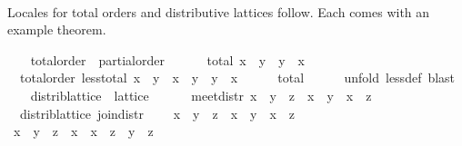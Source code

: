 \begin{isabellebody}
\endisataginvisible
{\isafoldinvisible}%
%
\isadeliminvisible
\isanewline
%
\endisadeliminvisible
\isanewline
\ \ \isamarkupfalse%
%
\begin{isamarkuptext}%
Locales for total orders and distributive lattices follow.
  Each comes with an example theorem.%
\end{isamarkuptext}%
\isamarkuptrue%
\ \ \isamarkupfalse%
\ total{\isacharunderscore}order\ {\isacharequal}\ partial{\isacharunderscore}order\ {\isacharplus}\isanewline
\ \ \ \ \ total{\isacharcolon}\ {\isachardoublequoteopen}x\ {\isasymsqsubseteq}\ y\ {\isasymor}\ y\ {\isasymsqsubseteq}\ x{\isachardoublequoteclose}\isanewline
\isanewline
\ \ \isamarkupfalse%
\ {\isacharparenleft}\ total{\isacharunderscore}order{\isacharparenright}\ less{\isacharunderscore}total{\isacharcolon}\ {\isachardoublequoteopen}x\ {\isasymsqsubset}\ y\ {\isasymor}\ x\ {\isacharequal}\ y\ {\isasymor}\ y\ {\isasymsqsubset}\ x{\isachardoublequoteclose}\isanewline
%
\isadelimproof
\ \ \ \ %
\endisadelimproof
%
\isatagproof
{}\isamarkupfalse%
\ total\isanewline
\ \ \ \ \isamarkupfalse%
\ {\isacharparenleft}unfold\ less{\isacharunderscore}def{\isacharparenright}\ blast%
\endisatagproof
{\isafoldproof}%
%
\isadelimproof
\isanewline
%
\endisadelimproof
\isanewline
\ \ \isamarkupfalse%
\ distrib{\isacharunderscore}lattice\ {\isacharequal}\ lattice\ {\isacharplus}\isanewline
\ \ \ \ \ meet{\isacharunderscore}distr{\isacharcolon}\ {\isachardoublequoteopen}x\ {\isasymsqinter}\ {\isacharparenleft}y\ {\isasymsqunion}\ z{\isacharparenright}\ {\isacharequal}\ x\ {\isasymsqinter}\ y\ {\isasymsqunion}\ x\ {\isasymsqinter}\ z{\isachardoublequoteclose}\isanewline
\isanewline
\ \ \isamarkupfalse%
\ {\isacharparenleft}\ distrib{\isacharunderscore}lattice{\isacharparenright}\ join{\isacharunderscore}distr{\isacharcolon}\isanewline
\ \ \ \ {\isachardoublequoteopen}x\ {\isasymsqunion}\ {\isacharparenleft}y\ {\isasymsqinter}\ z{\isacharparenright}\ {\isacharequal}\ {\isacharparenleft}x\ {\isasymsqunion}\ y{\isacharparenright}\ {\isasymsqinter}\ {\isacharparenleft}x\ {\isasymsqunion}\ z{\isacharparenright}{\isachardoublequoteclose}\ \ \isanewline
%
\isadelimproof
\ \ \ \ %
\endisadelimproof
%
\isatagproof
{}\isamarkupfalse%
\ {\isacharminus}\isanewline
\ \ \ \ \isamarkupfalse%
\ {\isachardoublequoteopen}x\ {\isasymsqunion}\ {\isacharparenleft}y\ {\isasymsqinter}\ z{\isacharparenright}\ {\isacharequal}\ {\isacharparenleft}x\ {\isasymsqunion}\ {\isacharparenleft}x\ {\isasymsqinter}\ z{\isacharparenright}{\isacharparenright}\ {\isasymsqunion}\ {\isacharparenleft}y\ {\isasymsqinter}\ z{\isacharparenright}{\isachardoublequoteclose}\ \isamarkupfalse%

\end{isabellebody}
